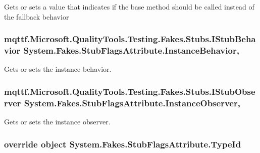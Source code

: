 Gets or sets a value that indicates if the base method should be called instead of the fallback behavior

\hypertarget{class_system_1_1_fakes_1_1_stub_flags_attribute_a53c4a9b619856a3a7f818fd880e8b960}{
\subsubsection[{Instance\-Behavior}]{\setlength{\rightskip}{0pt plus 5cm}mqttf.\-Microsoft.\-Quality\-Tools.\-Testing.\-Fakes.\-Stubs.\-I\-Stub\-Behavior System.\-Fakes.\-Stub\-Flags\-Attribute.\-Instance\-Behavior\hspace{0.3cm}{\ttfamily [get]}, {\ttfamily [set]}}}\label{class_system_1_1_fakes_1_1_stub_flags_attribute_a53c4a9b619856a3a7f818fd880e8b960}


Gets or sets the instance behavior.

\hypertarget{class_system_1_1_fakes_1_1_stub_flags_attribute_a7fe96b9b689597e6b65ca9a1de640c67}{
\subsubsection[{Instance\-Observer}]{\setlength{\rightskip}{0pt plus 5cm}mqttf.\-Microsoft.\-Quality\-Tools.\-Testing.\-Fakes.\-Stubs.\-I\-Stub\-Observer System.\-Fakes.\-Stub\-Flags\-Attribute.\-Instance\-Observer\hspace{0.3cm}{\ttfamily [get]}, {\ttfamily [set]}}}\label{class_system_1_1_fakes_1_1_stub_flags_attribute_a7fe96b9b689597e6b65ca9a1de640c67}


Gets or sets the instance observer.

\hypertarget{class_system_1_1_fakes_1_1_stub_flags_attribute_a10af025c593a7452b4ac34199dbb32a0}{
\subsubsection[{Type\-Id}]{\setlength{\rightskip}{0pt plus 5cm}override object System.\-Fakes.\-Stub\-Flags\-Attribute.\-Type\-Id\hspace{0.3cm}{\ttfamily [get]}}}\label{class_system_1_1_fakes_1_1_stub_flags_attribute_a10af025c593a7452b4ac34199dbb32a0}


